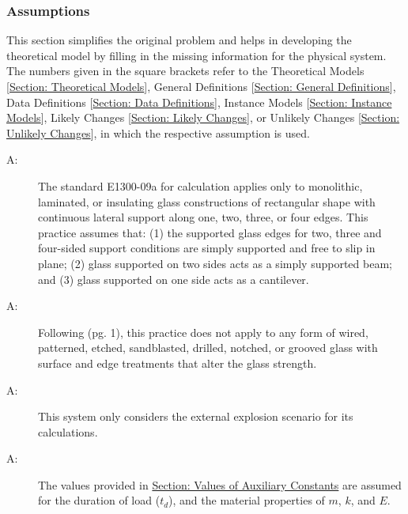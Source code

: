 \documentclass[12pt]{article}
\newcounter{assumpnum}
\newcommand{\atheassumpnum}{A\theassumpnum}
\begin{document}
\subsubsection{Assumptions}
\label{Sec:Assumps}
This section simplifies the original problem and helps in developing the theoretical model by filling in the missing information for the physical system. The numbers given in the square brackets refer to the Theoretical Models {[}\hyperref[Sec:TMs]{Section: Theoretical Models}{]}, General Definitions {[}\hyperref[Sec:GDs]{Section: General Definitions}{]}, Data Definitions {[}\hyperref[Sec:DDs]{Section: Data Definitions}{]}, Instance Models {[}\hyperref[Sec:IMs]{Section: Instance Models}{]}, Likely Changes {[}\hyperref[Sec:LCs]{Section: Likely Changes}{]}, or Unlikely Changes {[}\hyperref[Sec:UCs]{Section: Unlikely Changes}{]}, in which the respective assumption is used.
\begin{description}
\item[\atheassumpnum\label{A:glassType}:]The standard E1300-09a for calculation applies only to monolithic, laminated, or insulating glass constructions of rectangular shape with continuous lateral support along one, two, three, or four edges. This practice assumes that: (1) the supported glass edges for two, three and four-sided support conditions are simply supported and free to slip in plane; (2) glass supported on two sides acts as a simply supported beam; and (3) glass supported on one side acts as a cantilever.
\end{description}
\begin{description}
\item[\atheassumpnum\label{A:glassCondition}:]Following \cite{astm2009} (pg. 1), this practice does not apply to any form of wired, patterned, etched, sandblasted, drilled, notched, or grooved glass with surface and edge treatments that alter the glass strength.
\end{description}
\begin{description}
\item[\atheassumpnum\label{A:explainScenario}:]This system only considers the external explosion scenario for its calculations.
\end{description}
\begin{description}
\item[\atheassumpnum\label{A:standardValues}:]The values provided in \hyperref[Sec:AuxConstants]{Section: Values of Auxiliary Constants} are assumed for the duration of load (${t_{d}}$), and the material properties of $m$, $k$, and $E$.
\end{description}
\end{document}
